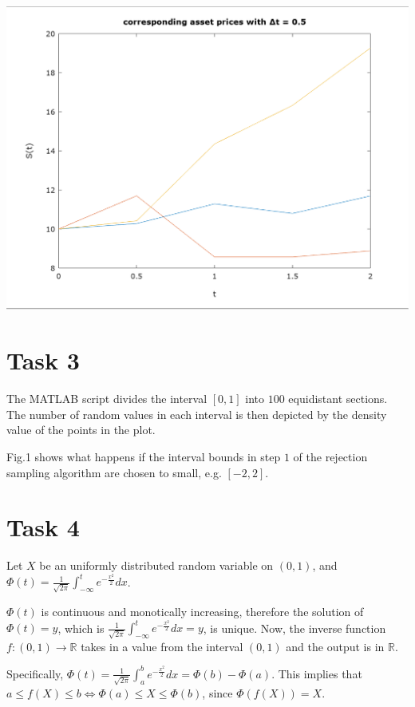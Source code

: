 \documentclass[10pt,a4paper]{article}
\begin{document}
\begin{center}
\includegraphics[scale=0.45]{asset_05.jpeg}		
\end{center}	

\section*{Task 3}

The MATLAB script divides the interval $[0,1]$ into $100$ equidistant sections. The number of random values in each interval is then depicted by the density value of the points in the plot.

Fig.1 shows what happens if the interval bounds in step $1$ of the rejection sampling algorithm are chosen to small, e.g. $[-2,2]$.  


\section*{Task 4}

Let $X$ be an uniformly distributed random variable on $(0,1)$, and $\Phi(t)=\frac{1}{\sqrt{2 \pi}}\int_{-\infty}^{t}e^{-\frac{x^2}{2}}dx$.
 
$\Phi(t)$ is continuous and monotically increasing, therefore the solution of $\Phi(t)=y$, which is $\frac{1}{\sqrt{2 \pi}}\int_{-\infty}^{t}e^{-\frac{x^2}{2}}dx=y$, is unique. Now, the inverse function $f:(0,1)\rightarrow \mathbb{R}$ takes in a value from the interval $(0,1)$ and the output is in $\mathbb{R}$.

Specifically, $\Phi(t)=\frac{1}{\sqrt{2 \pi}}\int_{a}^{b}e^{-\frac{x^2}{2}}dx=\Phi(b)-\Phi(a)$. This implies that $a\leq f(X) \leq b \Leftrightarrow \Phi(a)\leq X \leq \Phi(b)$, since $\Phi(f(X))=X$.
\end{document}
